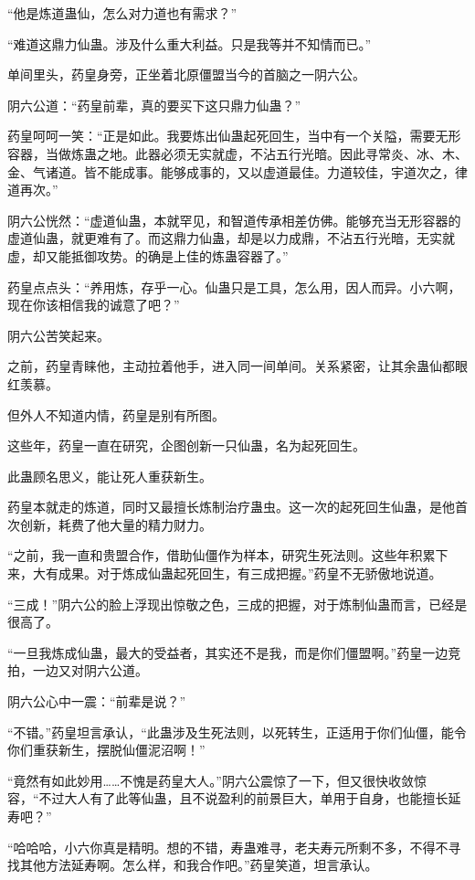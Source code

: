 \begin{this_body}
“他是炼道蛊仙，怎么对力道也有需求？”

“难道这鼎力仙蛊。涉及什么重大利益。只是我等并不知情而已。”

单间里头，药皇身旁，正坐着北原僵盟当今的首脑之一阴六公。

阴六公道：“药皇前辈，真的要买下这只鼎力仙蛊？”

药皇呵呵一笑：“正是如此。我要炼出仙蛊起死回生，当中有一个关隘，需要无形容器，当做炼蛊之地。此器必须无实就虚，不沾五行光暗。因此寻常炎、冰、木、金、气诸道。皆不能成事。能够成事的，又以虚道最佳。力道较佳，宇道次之，律道再次。”

阴六公恍然：“虚道仙蛊，本就罕见，和智道传承相差仿佛。能够充当无形容器的虚道仙蛊，就更难有了。而这鼎力仙蛊，却是以力成鼎，不沾五行光暗，无实就虚，却又能抵御攻势。的确是上佳的炼蛊容器了。”

药皇点点头：“养用炼，存乎一心。仙蛊只是工具，怎么用，因人而异。小六啊，现在你该相信我的诚意了吧？”

阴六公苦笑起来。

之前，药皇青睐他，主动拉着他手，进入同一间单间。关系紧密，让其余蛊仙都眼红羡慕。

但外人不知道内情，药皇是别有所图。

这些年，药皇一直在研究，企图创新一只仙蛊，名为起死回生。

此蛊顾名思义，能让死人重获新生。

药皇本就走的炼道，同时又最擅长炼制治疗蛊虫。这一次的起死回生仙蛊，是他首次创新，耗费了他大量的精力财力。

“之前，我一直和贵盟合作，借助仙僵作为样本，研究生死法则。这些年积累下来，大有成果。对于炼成仙蛊起死回生，有三成把握。”药皇不无骄傲地说道。

“三成！”阴六公的脸上浮现出惊敬之色，三成的把握，对于炼制仙蛊而言，已经是很高了。

“一旦我炼成仙蛊，最大的受益者，其实还不是我，而是你们僵盟啊。”药皇一边竞拍，一边又对阴六公道。

阴六公心中一震：“前辈是说？”

“不错。”药皇坦言承认，“此蛊涉及生死法则，以死转生，正适用于你们仙僵，能令你们重获新生，摆脱仙僵泥沼啊！”

“竟然有如此妙用……不愧是药皇大人。”阴六公震惊了一下，但又很快收敛惊容，“不过大人有了此等仙蛊，且不说盈利的前景巨大，单用于自身，也能擅长延寿吧？”

“哈哈哈，小六你真是精明。想的不错，寿蛊难寻，老夫寿元所剩不多，不得不寻找其他方法延寿啊。怎么样，和我合作吧。”药皇笑道，坦言承认。


\end{this_body}
